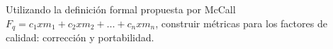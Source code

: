 Utilizando la definición formal propuesta por McCall $F_q = c_1 x m_1 + c_2xm_2 + ... + c_nxm_n$, construir métricas para los factores de calidad: corrección y portabilidad.
